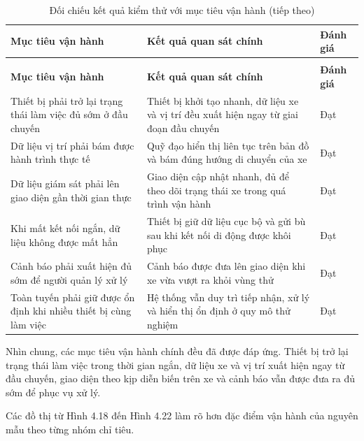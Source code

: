 \documentclass[a4paper]{extarticle}
\newcommand{\thesissettableid}[2]{%
  \renewcommand{\thetable}{#1}%
  \renewcommand{\theHtable}{#2}%
}
\begin{document}
{\thesissettableid{4.4}{condensed-r2-bang-4-4-doi-chieu-ket-qua-kiem-thu-voi-muc-tieu-van-hanh}
\def\LTcaptype{table}
\begin{longtable}{|L{(\linewidth - 4\tabcolsep) * }|L{(\linewidth - 4\tabcolsep) * }|L{(\linewidth - 4\tabcolsep) * }|}
\caption{Đối chiếu kết quả kiểm thử với mục tiêu vận hành}\label{tab:condensed-r2-bang-4-4-doi-chieu-ket-qua-kiem-thu-voi-muc-tieu-van-hanh}\\
\hline
\textbf{Mục tiêu vận hành} & \textbf{Kết quả quan sát chính} & \textbf{Đánh giá} \\
\hline
\endfirsthead
\caption[]{Đối chiếu kết quả kiểm thử với mục tiêu vận hành (tiếp theo)}\\
\hline
\textbf{Mục tiêu vận hành} & \textbf{Kết quả quan sát chính} & \textbf{Đánh giá} \\
\hline
\endhead
\endfoot
\endlastfoot
Thiết bị phải trở lại trạng thái làm việc đủ sớm ở đầu chuyến & Thiết bị khởi tạo nhanh, dữ liệu xe và vị trí đều xuất hiện ngay từ giai đoạn đầu chuyến & Đạt \\\hline
Dữ liệu vị trí phải bám được hành trình thực tế & Quỹ đạo hiển thị liên tục trên bản đồ và bám đúng hướng di chuyển của xe & Đạt \\\hline
Dữ liệu giám sát phải lên giao diện gần thời gian thực & Giao diện cập nhật nhanh, đủ để theo dõi trạng thái xe trong quá trình vận hành & Đạt \\\hline
Khi mất kết nối ngắn, dữ liệu không được mất hẳn & Thiết bị giữ dữ liệu cục bộ và gửi bù sau khi kết nối di động được khôi phục & Đạt \\\hline
Cảnh báo phải xuất hiện đủ sớm để người quản lý xử lý & Cảnh báo được đưa lên giao diện khi xe vừa vượt ra khỏi vùng thử & Đạt \\\hline
Toàn tuyến phải giữ được ổn định khi nhiều thiết bị cùng làm việc & Hệ thống vẫn duy trì tiếp nhận, xử lý và hiển thị ổn định ở quy mô thử nghiệm & Đạt \\\hline
\end{longtable}
}
Nhìn chung, các mục tiêu vận hành chính đều đã được đáp ứng. Thiết bị trở lại trạng thái làm việc trong thời gian ngắn, dữ liệu xe và vị trí xuất hiện ngay từ đầu chuyến, giao diện theo kịp diễn biến trên xe và cảnh báo vẫn được đưa ra đủ sớm để phục vụ xử lý.

Các đồ thị từ Hình 4.18 đến Hình 4.22 làm rõ hơn đặc điểm vận hành của nguyên mẫu theo từng nhóm chỉ tiêu.
\end{document}

